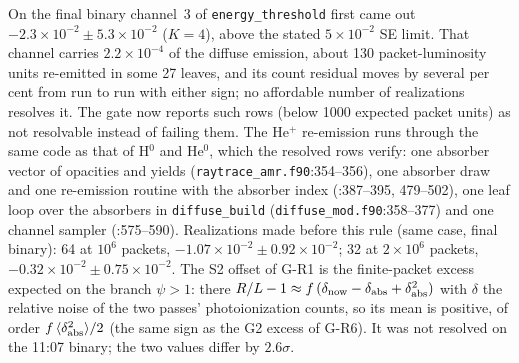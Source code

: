 \documentclass[english,a4paper]{my_memo}
\newcommand{\code}[1]{\texttt{#1}}
\begin{document}
On the final binary channel~3 of \code{energy\_threshold} first came out
$-2.3\times10^{-2}\pm5.3\times10^{-2}$ ($K=4$), above the stated
$5\times10^{-2}$ SE limit.  That channel carries $2.2\times10^{-4}$ of the
diffuse emission, about 130 packet-luminosity units re-emitted in some 27
leaves, and its count residual moves by several per cent from run to run
with either sign; no affordable number of realizations resolves it.  The
gate now reports such rows (below 1000 expected packet units) as not
resolvable instead of failing them.  The He$^+$ re-emission runs through
the same code as that of H$^0$ and He$^0$, which the resolved rows verify:
one absorber vector of opacities and yields
(\code{raytrace\_amr.f90}:354--356), one absorber draw and one re-emission
routine with the absorber index (:387--395, 479--502), one leaf loop over
the absorbers in \code{diffuse\_build} (\code{diffuse\_mod.f90}:358--377)
and one channel sampler (:575--590).  Realizations made before this rule
(same case, final binary): 64 at $10^6$ packets,
$-1.07\times10^{-2}\pm0.92\times10^{-2}$; 32 at $2\times10^6$ packets,
$-0.32\times10^{-2}\pm0.75\times10^{-2}$.
The S2 offset of G-R1 is the finite-packet excess expected on the branch
$\psi>1$: there $R/L-1\approx f\,(\delta_{\rm now}-\delta_{\rm abs}+\delta_{\rm
abs}^2)$ with $\delta$ the relative noise of the two passes' photoionization
counts, so its mean is positive, of order $f\,\langle\delta_{\rm abs}^2\rangle/2$
(the same sign as the G2 excess of G-R6).  It was not resolved on the 11:07
binary; the two values differ by $2.6\sigma$.
\end{document}
